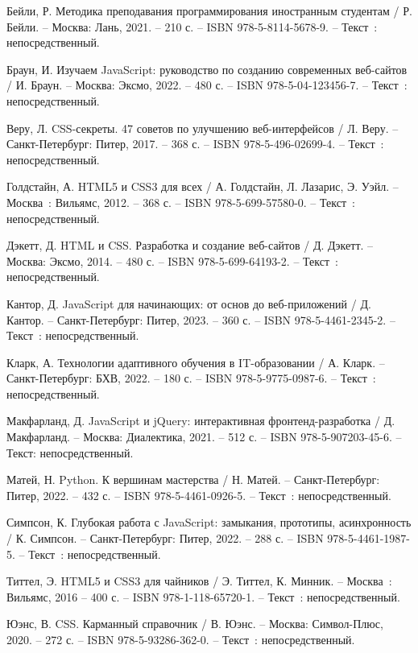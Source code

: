 
\begin{thebibliography}{9}

     Бейли, Р. Методика преподавания программирования иностранным студентам / Р. Бейли. – Москва: Лань, 2021. – 210 с. – ISBN 978-5-8114-5678-9. – Текст~: непосредственный.
    
     Браун, И. Изучаем JavaScript: руководство по созданию современных веб-сайтов / И. Браун. – Москва: Эксмо, 2022. – 480 с. – ISBN 978-5-04-123456-7. – Текст~: непосредственный.
    
     Веру, Л. CSS-секреты. 47 советов по улучшению веб-интерфейсов / Л. Веру. – Санкт-Петербург: Питер, 2017. – 368 с. – ISBN 978-5-496-02699-4. – Текст~: непосредственный.
    
    	Голдстайн, А. HTML5 и CSS3 для всех / А. Голдстайн, Л. Лазарис, Э. Уэйл. – Москва~: Вильямс, 2012. – 368 с. – ISBN 978-5-699-57580-0. – Текст~: непосредственный.
    
     Дэкетт, Д. HTML и CSS. Разработка и создание веб-сайтов / Д. Дэкетт. – Москва: Эксмо, 2014. – 480 с. – ISBN 978-5-699-64193-2. – Текст~: непосредственный.
	
     Кантор, Д. JavaScript для начинающих: от основ до веб-приложений / Д. Кантор. – Санкт-Петербург: Питер, 2023. – 360 с. – ISBN 978-5-4461-2345-2. – Текст~: непосредственный.
    
     Кларк, А. Технологии адаптивного обучения в IT-образовании / А. Кларк. – Санкт-Петербург: БХВ, 2022. – 180 с. – ISBN 978-5-9775-0987-6. – Текст~: непосредственный.
    
     Макфарланд, Д. JavaScript и jQuery: интерактивная фронтенд-разработка / Д. Макфарланд. – Москва: Диалектика, 2021. – 512 с. – ISBN 978-5-907203-45-6. – Текст: непосредственный.  

     Матей, Н. Python. К вершинам мастерства / Н. Матей. – Санкт-Петербург: Питер, 2022. – 432 с. – ISBN 978-5-4461-0926-5. – Текст~: непосредственный.

     Симпсон, К. Глубокая работа с JavaScript: замыкания, прототипы, асинхронность / К. Симпсон. – Санкт-Петербург: Питер, 2022. – 288 с. – ISBN 978-5-4461-1987-5. – Текст~: непосредственный.  
	
		Титтел, Э. HTML5 и CSS3 для чайников / Э. Титтел, К. Минник. – Москва~: Вильямс, 2016 – 400 с. – ISBN 978-1-118-65720-1. – Текст~: непосредственный.
	
     Юэнс, В. CSS. Карманный справочник / В. Юэнс. – Москва: Символ-Плюс, 2020. – 272 с. – ISBN 978-5-93286-362-0. – Текст~: непосредственный.


\end{thebibliography}
